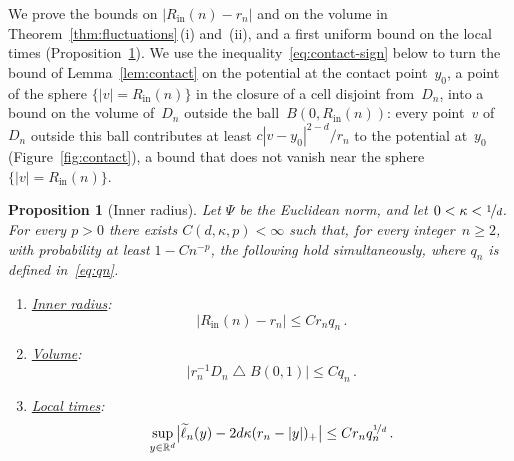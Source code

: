 \documentclass[11pt]{amsart}
\theoremstyle{plain}
\newtheorem{proposition}[theorem]{Proposition}
\theoremstyle{definition}
\newcommand{\R}{\mathbb R}
\newcommand{\drift}{\kappa}
\newcommand{\gauge}{\Psi}
\newcommand{\nf}{\nicefrac}
\newcommand{\Rin}{R_{\mathrm{in}}}
\numberwithin{equation}{section}
\begin{document}
We prove the bounds on $|\Rin(n)-r_n|$ and on the volume in Theorem~\ref{thm:fluctuations}\,(i) and~(ii), and a first uniform bound on the local times (Proposition~\ref{prop:inner}). We use the inequality~\eqref{eq:contact-sign} below to turn the bound of Lemma~\ref{lem:contact} on the potential at the contact point~$y_0$, a point of the sphere $\{|v|=\Rin(n)\}$ in the closure of a cell disjoint from~$D_n$, into a bound on the volume of~$D_n$ outside the ball~$B(0,\Rin(n))$: every point~$v$ of~$D_n$ outside this ball contributes at least $c|v-y_0|^{2-d}/r_n$ to the potential at~$y_0$ (Figure~\ref{fig:contact}), a bound that does not vanish near the sphere $\{|v|=\Rin(n)\}$.

\begin{proposition}[Inner radius]\label{prop:inner}
Let $\gauge$ be the Euclidean norm, and let $0<\drift<\nf1d$. For every $p>0$ there exists $C(d,\drift,p)<\infty$ such that, for every integer~$n\geq2$, with probability at least $1-Cn^{-p}$, the following hold simultaneously, where $q_n$ is defined in~\eqref{eq:qn}.
\begin{enumerate}[label=\textup{(\roman*)}]
\item \underline{\emph{Inner radius}}:
\begin{equation}\label{eq:inradius}
|\Rin(n)-r_n|\leq Cr_nq_n\, .
\end{equation}
\item \underline{\emph{Volume}}:
\begin{equation*}
\bigl|r_n^{-1}D_n\mathbin{\triangle}B(0,1)\bigr|\leq Cq_n\, .
\end{equation*}
\item \underline{\emph{Local times}}:
\begin{equation*}
\sup_{y\in\R^d}\bigl|\widetilde\ell_n(y)-2d\drift(r_n-|y|)_+\bigr|\leq Cr_nq_n^{\nf1d}\, .
\end{equation*}
\end{enumerate}
\end{proposition}
\end{document}
